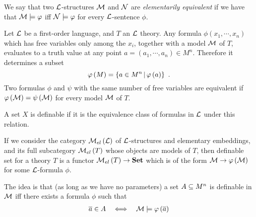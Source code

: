 \documentclass{amsart}
\begin{document}
\begin{defn}
We say that two $\mathcal{L}$-structures $\mathcal{M}$ and $\mathcal{N}$ are \emph{elementarily 
equivalent} if we have that $\mathcal{M}\models \varphi$
iff $\mathcal{N}\models \varphi$ for every $\mathcal{L}$-sentence $\phi$.
\end{defn}

Let $\mathcal{L}$ be a first-order language, and $T$ an $\mathcal{L}$ theory.
Any formula $\phi\left( x_1 , \cdots , x_n \right)$ which has free variables
only among the $x_i$, together with a model $\mathcal{M}$ of $T$,
evaluates to a truth value at any point $a = \left( a_1 , \cdots , a_n \right)\in M^n$.
Therefore it determines a subset 
\begin{equation}
\varphi\left( M \right) =
\left\{ a\in M^n \, \middle\vert \, \varphi\left( a \right) \right\} \ .
\end{equation}
Two formulas $\phi$ and $\psi$ with the same number of free variables are equivalent 
if $\varphi\left( \mathcal{M} \right)= \psi\left( \mathcal{M} \right)$ for every model $\mathcal{M}$ of $T$.

\begin{defn}
A set $X$ is definable if it is the
equivalence class of formulas in $\mathcal{L}$ under this relation.
\end{defn}

\begin{rmk}
If we consider the category $\mathcal{M}_{el}\left( \mathcal{L} \right)$
of $\mathcal{L}$-structures and elementary embeddings, and its full subcategory 
$\mathcal{M}_{el}\left( T \right)$ whose objects are models of $T$, 
then definable set for a theory $T$ is a functor 
$\mathcal{M}_{el}\left( T \right)\rightarrow \mathbf{Set}$ which is of the form
$\mathcal{M}\rightarrow\varphi\left( \mathcal{M} \right)$ for some $\mathcal{L}$-formula $\phi$.
\end{rmk}

The idea is that (as long as we have no parameters)
a set $A\subseteq M^n$ is definable in $\mathcal{M}$ iff there exists a formula $\phi$ such
that 
\begin{align}
\overline{a}\in A 
&&
\iff
&&
\mathcal{M} \models \varphi\left( \overline{a} \right)
\end{align}
\end{document}
